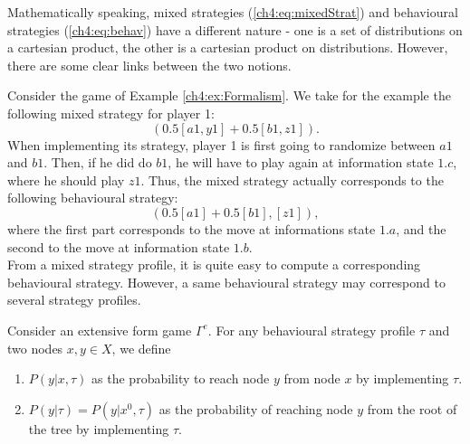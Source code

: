 Mathematically speaking, mixed strategies (\ref{ch4:eq:mixedStrat}) and behavioural strategies (\ref{ch4:eq:behav}) have  a different nature - one is a set of distributions on a cartesian product, the other is a cartesian product on distributions. However, there are some clear links between the two notions.

\begin{example}
Consider the game of Example \ref{ch4:ex:Formalism}.
We take for the example the following mixed strategy for player 1:
$$( 0.5[a1,y1] + 0.5 [b1,z1] ). $$
When implementing its strategy, player 1 is first going to randomize between $a1$ and $b1$. Then, if he did do $b1$, he will have to play again at information state $1.c$, where he should play $z1$. 
Thus, the mixed strategy actually corresponds to the following behavioural strategy:
$$ (0.5 [a1] + 0.5 [b1], [z1]), $$
where the first part corresponds to the move at informations state $1.a$, and the second to the move at information state $1.b$. \\
From a mixed strategy profile, it is quite easy to compute a corresponding behavioural strategy. However, a same behavioural strategy may correspond to several strategy profiles.
\end{example}



\begin{definition}
Consider an extensive form game $\Gamma^e$. For any behavioural strategy profile $\tau$ and two nodes $x,y \in X$, we define 
\begin{enumerate}
\item $P(y | x, \tau)$ as the probability to reach node $y$ from node $x$ by implementing $\tau$.
\item $P(y|\tau) = P(y | x^0, \tau)$ as the probability of reaching node $y$ from the root of the tree by implementing $\tau$.
\end{enumerate}
\end{definition}

